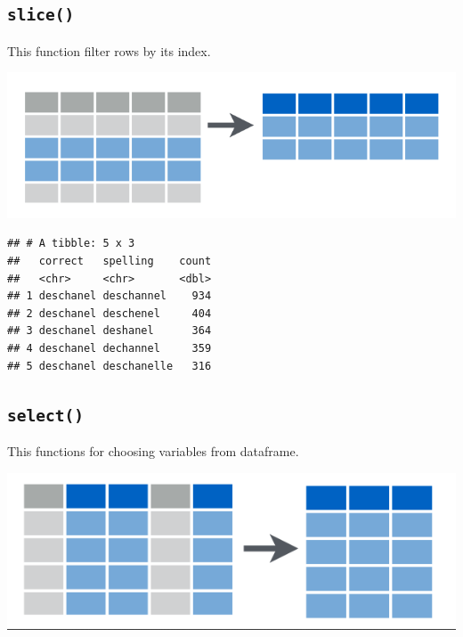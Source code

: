 \documentclass[
]{book}
\newenvironment{Shaded}{\begin{snugshade}}{\end{snugshade}}
\newcommand{\DecValTok}[1]{\textcolor[rgb]{0.00,0.00,0.81}{#1}}
\newcommand{\KeywordTok}[1]{\textcolor[rgb]{0.13,0.29,0.53}{\textbf{#1}}}
\newcommand{\NormalTok}[1]{#1}
\newcommand{\OperatorTok}[1]{\textcolor[rgb]{0.81,0.36,0.00}{\textbf{#1}}}
\newcommand{\StringTok}[1]{\textcolor[rgb]{0.31,0.60,0.02}{#1}}
\begin{document}
\hypertarget{slice}{%
\subsection{\texorpdfstring{\texttt{slice()}}{slice()}}\label{slice}}

This function filter rows by its index.

\includegraphics{images/02.01.filter.png}

\begin{Shaded}
\end{Shaded}

\begin{verbatim}
## # A tibble: 5 x 3
##   correct   spelling    count
##   <chr>     <chr>       <dbl>
## 1 deschanel deschannel    934
## 2 deschanel deschenel     404
## 3 deschanel deshanel      364
## 4 deschanel dechannel     359
## 5 deschanel deschanelle   316
\end{verbatim}

\hypertarget{select}{%
\subsection{\texorpdfstring{\texttt{select()}}{select()}}\label{select}}

This functions for choosing variables from dataframe.

\includegraphics{images/02.03.select.png}
\end{document}
